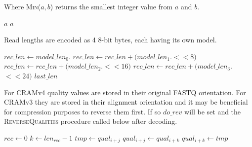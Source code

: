 \documentclass[a4paper]{article}
\begin{document}
Where \textsc{Min}($a,b$) returns the smallest integer value from $a$ and $b$.

\begin{algorithmic}[1]
    \State \Return $a$
  \Else
    \State \Return $a$
  \EndIf
  \EndFunction
\end{algorithmic}

Read lengths are encoded as 4 8-bit bytes, each having its own model.

\begin{algorithmic}[1]
\State $rec\_len \gets model\_len_0.$
\State $rec\_len \gets rec\_len + (model\_len_1.$$ << 8)$
\State $rec\_len \gets rec\_len + (model\_len_2.$$ << 16)$
\State $rec\_len \gets rec\_len + (model\_len_3.$$ << 24)$
\State \Return $last\_len$
\EndFunction
\end{algorithmic}

For CRAMv4 quality values are stored in their original FASTQ
orientation.  For CRAMv3 they are stored in their alignment
orientation and it may be beneficial for compression purposes to
reverse them first.  If so $do\_rev$ will be set and the
\textsc{ReverseQualities} procedure called below after decoding.

\begin{algorithmic}[1]
\State $rec \gets 0$
    \State $k \gets len_{rec}-1$
      \State $tmp \gets qual_{i+j}$
      \State $qual_{i+j} \gets qual_{i+k}$
      \State $qual_{i+k} \gets tmp$
    \EndFor
  \EndIf
\EndFor
\EndProcedure
\end{algorithmic}
\end{document}
